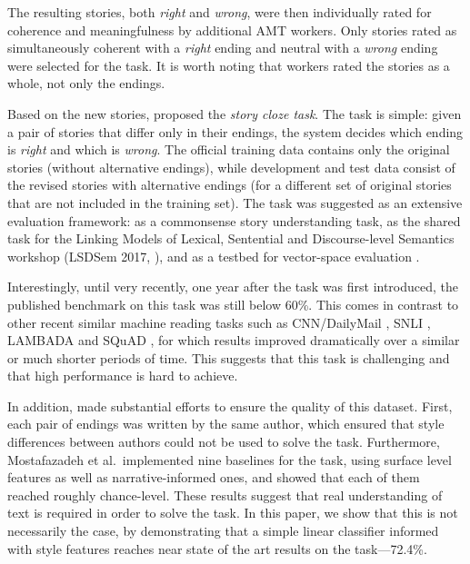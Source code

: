 \documentclass[11pt,a4paper]{article}
\begin{document}
The resulting stories, both {\it right} and {\it wrong}, were then individually rated for coherence and meaningfulness by additional AMT workers.
Only stories rated as simultaneously coherent with a {\it right} ending and neutral with a {\it wrong} ending were selected for the task. 
It is worth noting that workers rated the stories as a whole, not only the endings.

Based on the new stories, \citet{Mostafazadeh:2016} proposed the {\it story cloze task}. 
The task is simple:  given a pair of stories that differ only in their endings, the system decides which ending is {\it right} and which is {\it wrong}. 
The official training data contains only the original stories (without alternative endings), while development and test data consist of the revised stories with alternative endings (for a different set of original stories that are not included in the training set).
The task was suggested as an extensive evaluation framework:
as a commonsense story understanding task, 
as the shared task for the  Linking Models of Lexical, Sentential and Discourse-level Semantics workshop (LSDSem 2017, \citet{LSDSem:2017}), and as a testbed for vector-space evaluation \cite{mostafazadeh2016story}.

Interestingly, until very recently, one year after the task was first introduced, the published benchmark on this task was still below 60\%.
This comes in contrast to other recent similar machine reading tasks such as CNN/DailyMail \cite{hermann2015teaching}, SNLI \cite{bowman2015large}, LAMBADA \cite{Paperno:2016} and SQuAD \cite{rajpurkar2016squad}, for which results improved dramatically over a similar or much shorter periods of time. This suggests that this task is challenging and that high performance is hard to achieve.

In addition, \citet{Mostafazadeh:2016} made substantial efforts to ensure the quality of this dataset. 
First, each pair of endings was written by the same author, which
ensured that style differences between authors could not be used to solve the task. 
Furthermore, Mostafazadeh et al.~implemented nine baselines for the task, using surface level features as well as narrative-informed ones, and showed that each of them reached roughly chance-level.
These results suggest that real understanding of text is required in order to solve the task.
In this paper, we show that this is not necessarily the case, by demonstrating that a simple linear classifier informed with style features reaches near state of the art results on the task---72.4\%.
\end{document}
